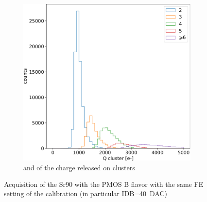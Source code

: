 \begin{figure}
\begin{subfigure}[b]{0.49\textwidth}
                \includegraphics[width=\linewidth]{figures/charaterization/Sr90_spectrum_cluster.pdf}
                \caption{and of the charge released on clusters}
                \label{fig:Sr90_cluster}
            \end{subfigure}
            \caption{Acquisition of the Sr90 with the PMOS B flavor with the same FE setting of the calibration (in particular IDB=\SI{40}{DAC})}
            \label{fig:spectrum_Sr90}
        \end{figure}


